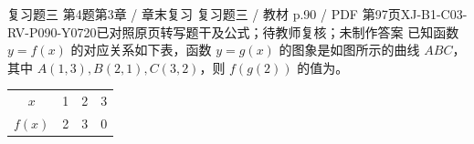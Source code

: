 \par\noindent\begin{minipage}{\linewidth}
\begin{bankitem}{复习题三 第4题}{第3章 / 章末复习 复习题三 / 教材 p.90 / PDF 第97页}{XJ-B1-C03-RV-P090-Y0720}{已对照原页转写题干及公式；待教师复核；未制作答案}
已知函数 $y=f(x)$ 的对应关系如下表，函数 $y=g(x)$ 的图象是如图所示的曲线 $ABC$，其中 $A(1,3),B(2,1),C(3,2)$，则 $f(g(2))$ 的值为\blank。
\begin{center}\begin{tabular}{c|rrr}\hline$x$&1&2&3\\$f(x)$&2&3&0\\\hline\end{tabular}\end{center}
\end{bankitem}
\end{minipage}\par\medskip
